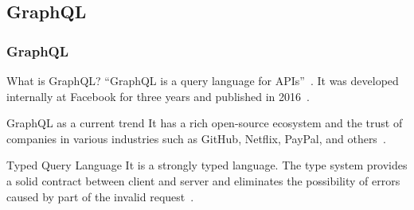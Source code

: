 \subsection{GraphQL}

\begin{frame}\frametitle{GraphQL}

  \begin{block}{What is GraphQL?}
    \enquote{GraphQL is a query language for APIs}~\cite{gql-spec}. It was developed internally at  Facebook for three years and published in 2016~\cite{initial-analysis-of-gql}. 
  \end{block}

  \begin{block}{GraphQL as a current trend}
    It has a rich open-source ecosystem and the trust of companies in various industries such as GitHub, Netflix, PayPal, and others~\cite{morph-gql-1,gql-healthcare}.
  \end{block}

\begin{block}{Typed Query Language}
  It is a strongly typed language. The type system provides a solid contract between client and server and eliminates the possibility of errors caused by part of the invalid request~\cite{real-time-sys-arc-based-on-gql}.
\end{block}

\end{frame}

